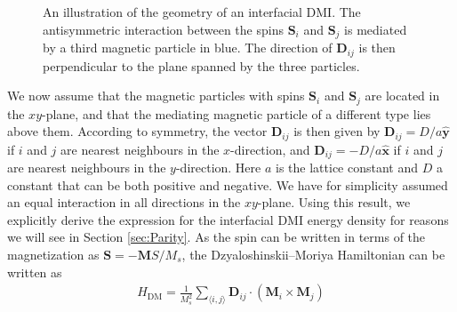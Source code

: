 \begin{figure}[h!]
\centering
{}
        \caption{An illustration of the geometry of an interfacial DMI. The antisymmetric interaction between the spins $\mathbold{S}_i$ and $\mathbold{S}_j$ is mediated by a third magnetic particle in blue. The direction of $\mathbold{D}_{ij}$ is then perpendicular to the plane spanned by the three particles.}
        \label{fig:InterfacialDMI}
\end{figure}
We now assume that the magnetic particles with spins $\mathbold{S}_i$ and $\mathbold{S}_j$ are located in the $xy$-plane, and that the mediating magnetic particle of a different type lies above them. According to symmetry, the vector $\mathbold{D}_{ij}$ is then given by $\mathbold{D}_{ij} = D/a\mathbold{\hat{y}}$ if $i$ and $j$ are nearest neighbours in the $x$-direction, and $\mathbold{D}_{ij} = -D/a\mathbold{\hat{x}}$ if $i$ and $j$ are nearest neighbours in the $y$-direction. Here $a$ is the lattice constant and $D$ a constant that can be both positive and negative. We have for simplicity assumed an equal interaction in all directions in the $xy$-plane. Using this result, we explicitly derive the expression for the interfacial DMI energy density for reasons we will see in Section \ref{sec:Parity}. As the spin can be written in terms of the magnetization as $\mathbold{S} = -\mathbold{M}S/M_s$, the Dzyaloshinskii--Moriya Hamiltonian can be written as
\begin{align}
    H_{\text{DM}} = \frac{1}{M_s^2}\sum_{\langle i,j\rangle} \mathbold{D}_{ij}\cdot\left( \mathbold{M}_i\times\mathbold{M}_j\right)
\end{align}
